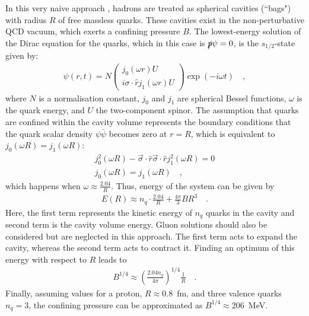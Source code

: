 In this very naive approach \cite{detarBAGMODELSHADRONS1983, matonohaUpsilonMesonProduction2018}, hadrons are treated as spherical cavities (``bags") with radius $R$ of free massless quarks. These cavities exist in the non-perturbative QCD vacuum, which exerts a confining pressure $B$. The lowest-energy solution of the Dirac equation for the quarks, which in this case is $\slashed p \psi = 0$, is the $s_{1/2}$-state given by:
\begin{align}
\psi (r, t) = N \begin{pmatrix} j_0(\omega r) U \\ i \sigma \cdot \hat{r} j_1(\omega r) U \end{pmatrix} \exp (-i \omega t) \quad ,
\end{align}
where $N$ is a normalisation constant, $j_0$ and $j_1$ are spherical Bessel functions, $\omega$ is the quark energy, and $U$ the two-component spinor. The assumption that quarks are confined within the cavity volume represents the boundary conditions that the quark scalar density $\psi \bar{\psi}$ becomes zero at $r=R$, which is equivalent to $j_0(\omega R) = j_1(\omega R)$:
\begin{align}
j_0^2(\omega R) - \vec{\sigma} \cdot \hat{r} \vec{\sigma} \cdot \hat{r} j_1^2(\omega R) = 0 \\
j_0(\omega R) = j_1(\omega R) \quad ,
\end{align}
which happens when $\omega \approx \frac{2.04}{R}$. Thus, energy of the system can be given by
\begin{align}
E(R) \approx n_q \cdot \frac{2.04}{R} + \frac{4\pi}{3} B R^3 \quad .
\end{align}
Here, the first term represents the kinetic energy of $n_q$ quarks in the cavity and second term is the cavity volume energy. Gluon solutions should also be considered but are neglected in this approach. The first term acts to expand the cavity, whereas the second term acts to contract it. Finding an optimum of this energy with respect to $R$ leads to
\begin{align}\label{eq:intro:bagp}
B^{1/4} \approx \left( \frac{2.04 n_q}{4\pi} \right)^{1/4} \frac{1}{R} \quad .
\end{align}
Finally, assuming values for a proton, $R\approx 0.8$~fm, and three valence quarks $n_q=3$, the confining pressure can be approximated as $B^{1/4} \approx 206$~MeV. \cite{detarBAGMODELSHADRONS1983}

